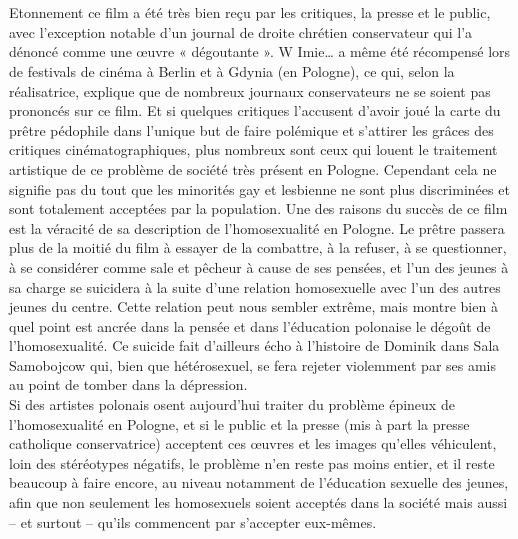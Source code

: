 \documentclass[12pt]{amsart}
\begin{document}
\\ \\
Etonnement ce film a été très bien reçu par les critiques, la presse et le public, avec l’exception notable d’un journal de droite chrétien conservateur qui l’a dénoncé comme une œuvre « dégoutante ». W Imie… a même été récompensé lors de festivals de cinéma à Berlin et à Gdynia (en Pologne), ce qui, selon la réalisatrice, explique que de nombreux journaux conservateurs ne se soient pas prononcés sur ce film. Et si quelques critiques l’accusent d’avoir joué la carte du prêtre pédophile dans l’unique but de faire polémique et s’attirer les grâces des critiques cinématographiques, plus nombreux sont ceux qui louent le traitement artistique de ce problème de société très présent en Pologne. Cependant cela ne signifie pas du tout que les minorités gay et lesbienne ne sont plus discriminées et sont totalement acceptées par la population. Une des raisons du succès de ce film est la véracité de sa description de l’homosexualité en Pologne. Le prêtre passera plus de la moitié du film à essayer de la combattre, à la refuser, à se questionner, à se considérer comme sale et pêcheur à cause de ses pensées, et l’un des jeunes à sa charge se suicidera à la suite d’une relation homosexuelle avec l’un des autres jeunes du centre. Cette relation peut nous sembler extrême, mais montre bien à quel point est ancrée dans la pensée et dans l’éducation polonaise le dégoût de l’homosexualité. Ce suicide fait d’ailleurs écho à l’histoire de Dominik dans Sala Samobojcow qui, bien que hétérosexuel, se fera rejeter violemment par ses amis au point de tomber dans la dépression. \\
Si des artistes polonais osent aujourd’hui traiter du problème épineux de l’homosexualité en Pologne, et si le public et la presse (mis à part la presse catholique conservatrice) acceptent ces œuvres et les images qu’elles véhiculent, loin des stéréotypes négatifs, le problème n’en reste pas moins entier, et il reste beaucoup à faire encore, au niveau notamment de l’éducation sexuelle des jeunes, afin que non seulement les homosexuels soient acceptés dans la société mais aussi – et surtout – qu’ils commencent par s’accepter eux-mêmes.
\clearpage
\end{document}
